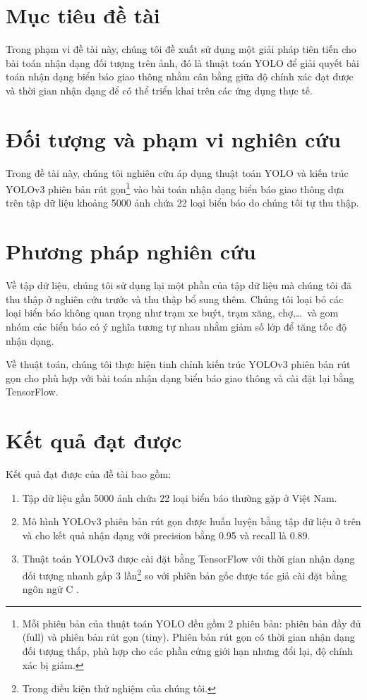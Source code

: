 \documentclass[../thesis.tex]{subfiles}
\begin{document}
\section{Mục tiêu đề tài}

Trong phạm vi đề tài này, chúng tôi đề xuất sử dụng một giải pháp tiên tiến cho bài toán nhận dạng đối tượng trên ảnh, đó là thuật toán YOLO \cite{DBLP:journals/corr/RedmonDGF15} để giải quyết bài toán nhận dạng biển báo giao thông nhằm cân bằng giữa độ chính xác đạt được và thời gian nhận dạng để có thể triển khai trên các ứng dụng thực tế.

\section{Đối tượng và phạm vi nghiên cứu}

Trong đề tài này, chúng tôi nghiên cứu áp dụng thuật toán YOLO \cite{DBLP:journals/corr/RedmonDGF15} và kiến trúc YOLOv3 \cite{DBLP:journals/corr/abs-1804-02767} phiên bản rút gọn\footnote{Mỗi phiên bản của thuật toán YOLO đều gồm 2 phiên bản: phiên bản đầy đủ (full) và phiên bản rút gọn (tiny). Phiên bản rút gọn có thời gian nhận dạng đối tượng thấp, phù hợp cho các phần cứng giới hạn nhưng đổi lại, độ chính xác bị giảm.} vào bài toán nhận dạng biển báo giao thông dựa trên tập dữ liệu khoảng 5000 ảnh chứa 22 loại biển báo do chúng tôi tự thu thập.

\section{Phương pháp nghiên cứu}

Về tập dữ liệu, chúng tôi sử dụng lại một phần của tập dữ liệu mà chúng tôi đã thu thập ở nghiên cứu trước \cite{faster-rcnn-nngbao-dldien} và thu thập bổ sung thêm. Chúng tôi loại bỏ các loại biển báo không quan trọng như trạm xe buýt, trạm xăng, chợ,\ldots\ và gom nhóm các biển báo có ý nghĩa tương tự nhau nhằm giảm số lớp để tăng tốc độ nhận dạng.

Về thuật toán, chúng tôi thực hiện tinh chỉnh kiến trúc YOLOv3 phiên bản rút gọn cho phù hợp với bài toán nhận dạng biển báo giao thông và cài đặt lại bằng TensorFlow. 

\section{Kết quả đạt được}

Kết quả đạt được của đề tài bao gồm:

\begin{enumerate}[topsep=0pt]
  \item Tập dữ liệu gần 5000 ảnh chứa 22 loại biển báo thường gặp ở Việt Nam.
  \item Mô hình YOLOv3 phiên bản rút gọn được huấn luyện bằng tập dữ liệu ở trên và cho kết quả nhận dạng với precision bằng 0.95 và recall là 0.89.
  \item Thuật toán YOLOv3 được cài đặt bằng TensorFlow với thời gian nhận dạng đối tượng nhanh gấp 3 lần\footnote{Trong điều kiện thử nghiệm của chúng tôi.} so với phiên bản gốc được tác giả cài đặt bằng ngôn ngữ C \cite{darknet}.
\end{enumerate}
\end{document}
